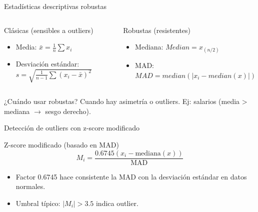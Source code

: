 \documentclass[aspectratio=169, 10pt, xcolor=table]{beamer}
\begin{document}
\begin{frame}{Estadísticas descriptivas robustas}
    \begin{columns}[t]
        \begin{alertblock}{Clásicas (sensibles a outliers)}
            \begin{itemize}
                \item Media: $\bar{x} = \frac{1}{n}\sum x_i$
                \item Desviación estándar: $s = \sqrt{\frac{1}{n-1}\sum (x_i-\bar{x})^2}$
            \end{itemize}
        \end{alertblock}
        \begin{exampleblock}{Robustas (resistentes)}
            \begin{itemize}
                \item Mediana: $Median = x_{(n/2)}$
                \item MAD: $MAD = median(|x_i - median(x)|)$
            \end{itemize}
        \end{exampleblock}
    \end{columns}
    \vspace{0.3cm}
    \begin{block}{¿Cuándo usar robustas?}
        Cuando hay asimetría o outliers. Ej: salarios (media > mediana $\rightarrow$ sesgo derecho).
    \end{block}
\end{frame}

\begin{frame}{Detección de outliers con z-score modificado}
    \begin{block}{Z-score modificado (basado en MAD)}
        \[
        M_i = \frac{0.6745(x_i - \text{mediana}(x))}{\text{MAD}}
        \]
        \begin{itemize}
            \item Factor 0.6745 hace consistente la MAD con la desviación estándar en datos normales.
            \item Umbral típico: $|M_i| > 3.5$ indica outlier.
        \end{itemize}
    \end{block}
\end{frame}
\end{document}
